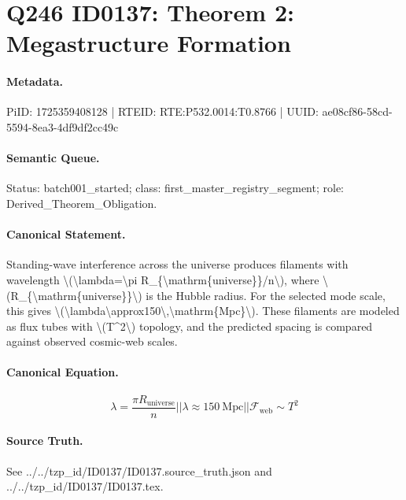 \section*{Q246 ID0137: Theorem 2: Megastructure Formation}
\paragraph{Metadata.}
PiID: 1725359408128 | RTEID: RTE:P532.0014:T0.8766 | UUID: ae08cf86-58cd-5594-8ea3-4df9df2cc49c

\paragraph{Semantic Queue.}
Status: batch001\_started; class: first\_master\_registry\_segment; role: Derived\_Theorem\_Obligation.

\paragraph{Canonical Statement.}
Standing-wave interference across the universe produces filaments with wavelength \textbackslash{}(\textbackslash{}lambda=\textbackslash{}pi R\_\{\textbackslash{}mathrm\{universe\}\}/n\textbackslash{}), where \textbackslash{}(R\_\{\textbackslash{}mathrm\{universe\}\}\textbackslash{}) is the Hubble radius. For the selected mode scale, this gives \textbackslash{}(\textbackslash{}lambda\textbackslash{}approx150\textbackslash{},\textbackslash{}mathrm\{Mpc\}\textbackslash{}). These filaments are modeled as flux tubes with \textbackslash{}(T\textasciicircum{}2\textbackslash{}) topology, and the predicted spacing is compared against observed cosmic-web scales.

\paragraph{Canonical Equation.}
\[
\lambda=\frac{\pi R_{\mathrm{universe}}}{n} || \lambda \approx 150\ \mathrm{Mpc} || \mathcal{F}_{\mathrm{web}}\sim T^2
\]

\paragraph{Source Truth.}
See ../../tzp\_id/ID0137/ID0137.source\_truth.json and ../../tzp\_id/ID0137/ID0137.tex.
